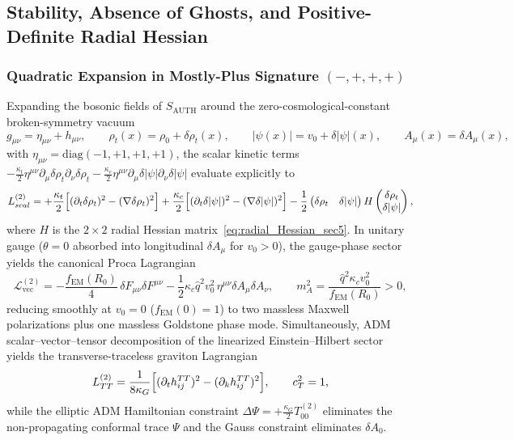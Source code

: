 \subsection{Stability, Absence of Ghosts, and Positive-Definite Radial Hessian}

\subsubsection{Quadratic Expansion in Mostly-Plus Signature $(-,+,+,+)$}

Expanding the bosonic fields of $S_{\mathrm{AUTH}}$ around the zero-cosmological-constant broken-symmetry vacuum
\[
g_{\mu\nu} = \eta_{\mu\nu} + h_{\mu\nu}, \qquad
\rho_t(x) = \rho_0 + \delta\rho_t(x), \qquad
|\psi(x)| = v_0 + \delta|\psi|(x), \qquad
A_\mu(x) = \delta A_\mu(x),
\]
with $\eta_{\mu\nu} = \mathrm{diag}(-1,+1,+1,+1)$, the scalar kinetic terms $-\frac{\kappa_t}{2}\eta^{\mu\nu}\partial_\mu\delta\rho_t\partial_\nu\delta\rho_t - \frac{\kappa_c}{2}\eta^{\mu\nu}\partial_\mu\delta|\psi|\partial_\nu\delta|\psi|$ evaluate explicitly to
\begin{equation}
\mathcal{L}_{\mathrm{scal}}^{(2)}
= +\frac{\kappa_t}{2}\Bigl[(\partial_t\delta\rho_t)^2 - (\nabla\delta\rho_t)^2\Bigr]
  + \frac{\kappa_c}{2}\Bigl[(\partial_t\delta|\psi|)^2 - (\nabla\delta|\psi|)^2\Bigr]
  - \frac{1}{2}
  \begin{pmatrix}\delta\rho_t & \delta|\psi|\end{pmatrix}
  H
  \begin{pmatrix}\delta\rho_t \\ \delta|\psi|\end{pmatrix},
\label{eq:quadratic_scalar_lagrangian_sec19}
\end{equation}
where $H$ is the $2\times 2$ radial Hessian matrix~\eqref{eq:radial_Hessian_sec5}. In unitary gauge ($\theta = 0$ absorbed into longitudinal $\delta A_\mu$ for $v_0 > 0$), the gauge-phase sector yields the canonical Proca Lagrangian
\begin{equation}
\mathcal{L}_{\mathrm{vec}}^{(2)}
= -\frac{f_{\mathrm{EM}}(R_0)}{4}\,\delta F_{\mu\nu}\delta F^{\mu\nu}
  - \frac{1}{2}\kappa_c\hat{q}^2 v_0^2\,\eta^{\mu\nu}\delta A_\mu\delta A_\nu,
\qquad
m_A^2 = \frac{\hat{q}^2\kappa_c v_0^2}{f_{\mathrm{EM}}(R_0)} > 0,
\label{eq:proca_mass_sec19}
\end{equation}
reducing smoothly at $v_0 = 0$ ($f_{\mathrm{EM}}(0)=1$) to two massless Maxwell polarizations plus one massless Goldstone phase mode. Simultaneously, ADM scalar--vector--tensor decomposition of the linearized Einstein--Hilbert sector yields the transverse-traceless graviton Lagrangian
\begin{equation}
\mathcal{L}_{\mathrm{TT}}^{(2)}
= \frac{1}{8\kappa_G}\Bigl[(\partial_t h_{ij}^{\mathrm{TT}})^2 - (\partial_k h_{ij}^{\mathrm{TT}})^2\Bigr],
\qquad
c_T^2 = 1,
\label{eq:graviton_TT_sec19}
\end{equation}
while the elliptic ADM Hamiltonian constraint $\Delta\Psi = +\frac{\kappa_G}{2}T_{00}^{(2)}$ eliminates the non-propagating conformal trace $\Psi$ and the Gauss constraint eliminates $\delta A_0$.

